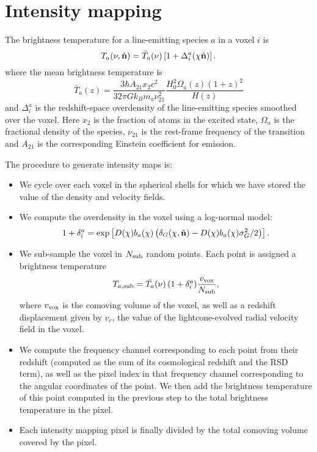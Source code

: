 \documentclass[a4paper,10pt]{article}
\begin{document}
\section{Intensity mapping}
  The brightness temperature for a line-emitting species $a$ in a voxel $i$ is
  \begin{equation}
    T_a(\nu,\hat{\bf n})=\bar{T}_a(\nu)\left[1+\Delta^a_i(\chi\hat{\bf n})\right].
  \end{equation}
  where the mean brightness temperature is
  \begin{equation}
    \bar{T}_a(z)=\frac{3\hbar A_{21} x_2 c^2}{32\pi G k_B m_a \nu_{21}^2}
    \frac{H_0^2\Omega_{a}(z)(1+z)^2}{H(z)}
  \end{equation}
  and $\Delta^a_i$ is the redshift-space overdensity of the line-emitting species
  smoothed over the voxel. Here $x_2$ is the fraction of atoms in the excited state,
  $\Omega_a$ is the fractional density of the species, $\nu_{21}$ is the rest-frame
  frequency of the transition and $A_{21}$ is the corresponding Einstein coefficient
  for emission.

  The procedure to generate intensity maps is:
  \begin{itemize}
    \item We cycle over each voxel in the spherical shells for which we have stored
      the value of the density and velocity fields.
    \item We compute the overdensity in the voxel using a log-normal model:
      \begin{equation}
        1+\delta^a_i=
        \exp\left[D(\chi)b_a(\chi)\left(\delta_G(\chi,\hat{\bf n})-
          D(\chi)b_a(\chi)\sigma_G^2/2\right)\right].
      \end{equation}
    \item We sub-sample the voxel in $N_{\rm sub}$ random points. Each point is
      assigned a brightness temperature
      \begin{equation}
        T_{a,{\rm sub}}=\bar{T_a}(\nu)\,(1+\delta^a_i)\frac{v_{\rm vox}}{N_{\rm sub}},
      \end{equation}
      where $v_{\rm vox}$ is the comoving volume of the voxel, as well as a redshift
      displacement given by $v_r$, the value of the lightcone-evolved radial velocity
      field in the voxel.
    \item We compute the frequency channel corresponding to each point from their
      redshift (computed as the sum of its cosmological redshift and the RSD term),
      as well as the pixel index in that frequency channel corresponding to the
      angular coordinates of the point. We then add the brightness temperature of
      this point computed in the previous step to the total brightness temperature
      in the pixel.
    \item Each intensity mapping pixel is finally divided by the total comoving
      volume covered by the pixel.
  \end{itemize}
  
\end{document}
